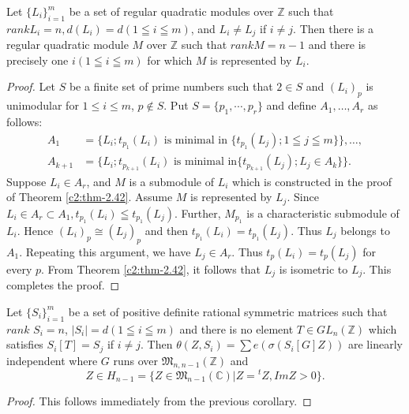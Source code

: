 \setcounter{cor}{0}
\begin{cor}
Let $\{L_i\}^m_{i=1}$ be a set of regular quadratic modules over
$\mathbb{Z}$ such that $rank L_i = n, d(L_i) = d(1\leqq i \leqq m)$,
and $L_i \neq L_j$ if $i\neq j$. Then there is a regular quadratic
module $M$ over $\mathbb{Z}$ such that $rank M=n-1$ and there is
precisely one $i(1\leqq i \leqq m)$ for which $M$ is represented by
$L_i$. 
\end{cor}

\begin{proof}
Let $S$ be a finite set of prime numbers such that $2\in S$
and $(L_i)_p$ is unimodular for $1\leq i \leq m$, $p\not\in S$. Put
$S=\{p_1,\cdots,p_r\}$ and define $A_1,\ldots, A_r$ as follows: 
\begin{align*}
A_1 & = \{L_i ; t_{p_1}(L_i) \text{ is minimal in } \{t_{p_1} (L_j);
1\leqq j \leqq m\} \}, \ldots,\\
A_{k+1} & = \{L_i; t_{p_{k+1}} (L_i)\text{ is minimal in
} \{t_{p_{k+1}} (L_j); L_j \in A_k\} \}.
\end{align*}\pageoriginale 
Suppose $L_i \in A_r$, and $M$ is a submodule of $L_i$ which is
constructed in the proof of Theorem \ref{c2:thm-2.42}. Assume $M$ is represented by
$L_j$. Since $L_i \in A_r \subset A_1, t_{p_1} (L_i) \leqq
t_{p_1} (L_j)$. Further, $M_{p_1}$ is a characteristic submodule of
$L_i$. Hence $(L_i)_p \cong (L_j)_p$ and then $t_{p_1}(L_i) =
t_{p_1}(L_j)$. Thus $L_j$ belongs to $A_1$. Repeating this argument,
we have $L_j \in A_r$. Thus $t_p(L_i) = t_p(L_j)$ for every
$p$. From Theorem \ref{c2:thm-2.42}, it follows that $L_j$ is isometric to
$L_j$. This completes the proof.
\end{proof}

\begin{cor}
Let $\{S_i\}^m_{i=1}$ be a set of positive definite rational symmetric
matrices such that $rank$ $S_i =n$, $|S_i|=d(1\leqq i \leqq m)$ and
there is no element $T\in GL_n(\mathbb{Z})$ which satisfies $S_i
[T]=S_j$ if $i\neq j$. Then $\theta(Z,S_i) = \sum e(\sigma(S_i[G]Z))$
are linearly independent where $G$ runs over
$\mathfrak{M}_{n,n-1}(\mathbb{Z})$ and 
$$  
Z \in H_{n-1} = \{Z\in \mathfrak{M}_{n-1}
(\mathbb{C})|Z = {}^tZ, Im Z>0\}.
$$
\end{cor}

\begin{proof}
This follows immediately from the previous corollary.
\end{proof}

